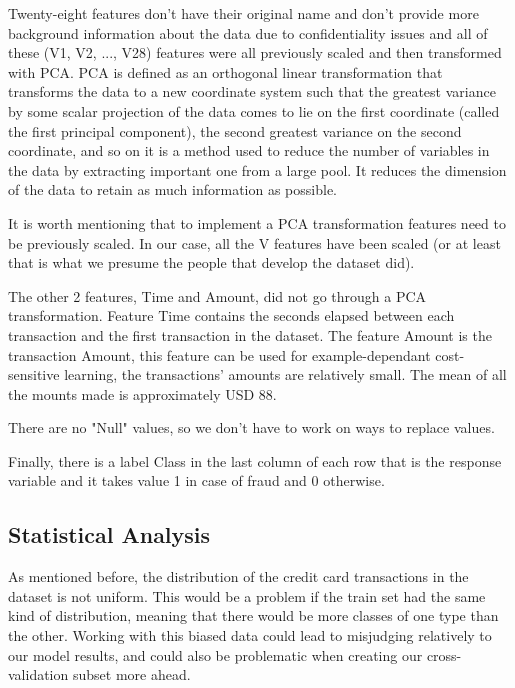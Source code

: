\documentclass[conference]{IEEEtran}
\begin{document}
Twenty-eight features don't have their original name and don't provide more background information about the data due to confidentiality issues and all of these (V1, V2, ..., V28) features were all previously scaled and then transformed with PCA. PCA is defined as an orthogonal linear transformation that transforms the data to a new coordinate system such that the greatest variance by some scalar projection of the data comes to lie on the first coordinate (called the first principal component), the second greatest variance on the second coordinate, and so on it is a method used to reduce the number of variables in the data by extracting important one from a large pool. It reduces the dimension of the data to retain as much information as possible.

It is worth mentioning that to implement a PCA transformation features need to be previously scaled. In our case, all the V features have been scaled (or at least that is what we presume the people that develop the dataset did).

The other 2 features, Time and Amount, did not go through a PCA transformation. Feature Time contains the seconds elapsed between each transaction and the first transaction in the dataset. The feature Amount is the transaction Amount, this feature can be used for example-dependant cost-sensitive learning, the transactions' amounts are relatively small. The mean of all the mounts made is approximately USD 88.

There are no "Null" values, so we don't have to work on ways to replace values.

Finally, there is a label Class in the last column of each row that is the response variable and it takes value 1 in case of fraud and 0 otherwise.

\subsection{Statistical Analysis}

As mentioned before, the distribution of the credit card transactions in the dataset is not uniform. This would be a problem if the train set had the same kind of distribution, meaning that there would be more classes of one type than the other. Working with this biased data could lead to misjudging relatively to our model results, and could also be problematic when creating our cross-validation subset more ahead.
\end{document}
